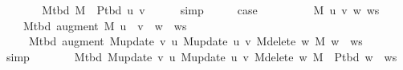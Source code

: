 \begin{isabellebody}
\ \ \isamarkupfalse%
\ \isamarkupfalse%
\ {\isachardoublequoteopen}{\isachardot}{\kern0pt}{\isachardot}{\kern0pt}{\isachardot}{\kern0pt}\ {\isacharequal}{\kern0pt}\ M{\isacharunderscore}{\kern0pt}tbd\ M\ {\isasymoplus}\ P{\isacharunderscore}{\kern0pt}tbd\ {\isacharbrackleft}{\kern0pt}u{\isacharcomma}{\kern0pt}\ v{\isacharbrackright}{\kern0pt}{\isachardoublequoteclose}\isanewline
\ \ \ \ \isamarkupfalse%
\ simp\isanewline
\ \ \isamarkupfalse%
\ \isamarkupfalse%
\ {\isacharquery}{\kern0pt}case\isanewline
\ \ \ \ \isacommand{{\isachardot}{\kern0pt}}\isamarkupfalse%
\isanewline
{}\isamarkupfalse%
\isanewline
\ \ \isamarkupfalse%
\ {\isacharparenleft}{\kern0pt}{}\ M\ u\ v\ w\ ws{\isacharparenright}{\kern0pt}\isanewline
\ \ \isamarkupfalse%
\isanewline
\ \ \ \ {\isachardoublequoteopen}M{\isacharunderscore}{\kern0pt}tbd\ {\isacharparenleft}{\kern0pt}augment\ M\ {\isacharparenleft}{\kern0pt}u\ {\isacharhash}{\kern0pt}\ v\ {\isacharhash}{\kern0pt}\ w\ {\isacharhash}{\kern0pt}\ ws{\isacharparenright}{\kern0pt}{\isacharparenright}{\kern0pt}\ {\isacharequal}{\kern0pt}\isanewline
\ \ \ \ \ M{\isacharunderscore}{\kern0pt}tbd\ {\isacharparenleft}{\kern0pt}augment\ {\isacharparenleft}{\kern0pt}M{\isacharunderscore}{\kern0pt}update\ v\ u\ {\isacharparenleft}{\kern0pt}M{\isacharunderscore}{\kern0pt}update\ u\ v\ {\isacharparenleft}{\kern0pt}M{\isacharunderscore}{\kern0pt}delete\ w\ M{\isacharparenright}{\kern0pt}{\isacharparenright}{\kern0pt}{\isacharparenright}{\kern0pt}\ {\isacharparenleft}{\kern0pt}w\ {\isacharhash}{\kern0pt}\ ws{\isacharparenright}{\kern0pt}{\isacharparenright}{\kern0pt}{\isachardoublequoteclose}\isanewline
\ \ \ \ \isamarkupfalse%
\ simp\isanewline
\ \ \isamarkupfalse%
\ \isamarkupfalse%
\ {\isachardoublequoteopen}{\isachardot}{\kern0pt}{\isachardot}{\kern0pt}{\isachardot}{\kern0pt}\ {\isacharequal}{\kern0pt}\ M{\isacharunderscore}{\kern0pt}tbd\ {\isacharparenleft}{\kern0pt}M{\isacharunderscore}{\kern0pt}update\ v\ u\ {\isacharparenleft}{\kern0pt}M{\isacharunderscore}{\kern0pt}update\ u\ v\ {\isacharparenleft}{\kern0pt}M{\isacharunderscore}{\kern0pt}delete\ w\ M{\isacharparenright}{\kern0pt}{\isacharparenright}{\kern0pt}{\isacharparenright}{\kern0pt}\ {\isasymoplus}\ P{\isacharunderscore}{\kern0pt}tbd\ {\isacharparenleft}{\kern0pt}w\ {\isacharhash}{\kern0pt}\ ws{\isacharparenright}{\kern0pt}{\isachardoublequoteclose}\isanewline
\ \ \isamarkupfalse%

\end{isabellebody}
